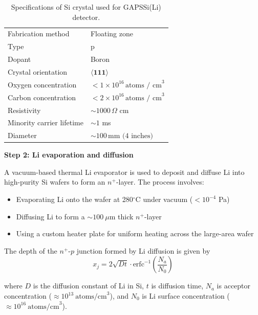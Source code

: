 \medskip

\begin{table}
\centering
\begin{tabularx}{\linewidth}{l >{\raggedleft\arraybackslash}X}
\midrule
Fabrication method & Floating zone \\
Type & p \\
Dopant & Boron \\
Crystal orientation & \(\langle \textbf{111} \rangle\) \\
Oxygen concentration & \(< 1 \times 10^{16} \, \text{atoms / cm}^3\) \\
Carbon concentration & \(< 2 \times 10^{16} \, \text{atoms / cm}^3\) \\
Resistivity & \(\sim 1000 \, \Omega\) cm \\
Minority carrier lifetime & \(\sim 1\) ms \\
Diameter & \(\sim 100 \, \text{mm (4 inches)}\) \\
\bottomrule
\end{tabularx}
\caption{Specifications of Si crystal used for \ac{GAPS}Si(Li) detector.}
\label{tab:Si_spec}
\end{table}


\noindent\textbf{Step 2: Li evaporation and diffusion}

\noindent 
A vacuum-based thermal Li evaporator is used to deposit and diffuse Li into high-purity Si wafers to form an \(n^{+}\)-layer. The process involves:
\begin{itemize}
    \item Evaporating Li onto the wafer at 280\(^\circ\)C under vacuum (\(<10^{-4}\) Pa)
    \item Diffusing Li to form a \(\sim 100~\mu\)m thick \(n^{+}\)-layer
    \item Using a custom heater plate for uniform heating across the large-area wafer
\end{itemize}

\noindent The depth of the \(n^{+}\)-\(p\) junction formed by Li diffusion is given by \cite{LITOVCHENKO2003408}
\begin{equation}
    x_{j}=2\sqrt{Dt}\cdot\text{erfc}^{-1}\left(\frac{N_{a}}{N_{0}}\right)
\end{equation}

\noindent where \(D\) is the diffusion constant of Li in Si, \(t\) is diffusion time, \(N_{a}\) is acceptor concentration (\(\approx 10^{13}~\text{atoms/cm}^3\)), and \(N_{0}\) is Li surface concentration (\(\approx 10^{16}~\text{atoms/cm}^3\)).

